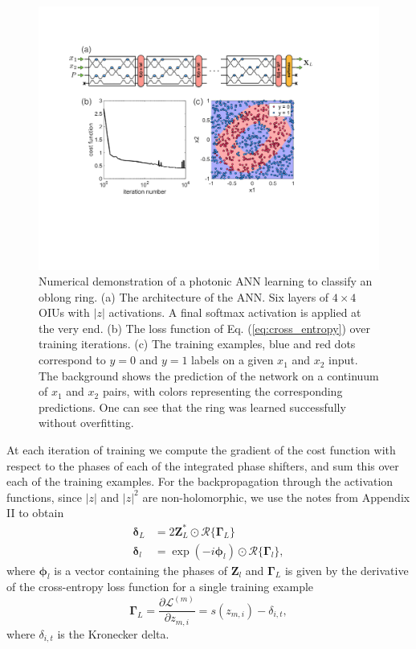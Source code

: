\begin{figure}
\includegraphics[width=\columnwidth]{figures/insitu_ring}
\caption{Numerical demonstration of a photonic ANN learning to classify an oblong ring. (a) The architecture of the ANN.  Six layers of $4 \times 4$ OIUs with $|z|$ activations.  A final softmax activation is applied at the very end.  (b) The loss function of Eq. (\ref{eq:cross_entropy}) over training iterations. (c) The training examples, blue and red dots correspond to $y=0$ and $y=1$ labels on a given $x_1$ and $x_2$ input.  The background shows the prediction of the network on a continuum of $x_1$ and $x_2$ pairs, with colors representing the corresponding predictions.  One can see that the ring was learned successfully without overfitting.  \label{fig:demo} }
\end{figure}

At each iteration of training we compute the gradient of the cost function with respect to the phases of each of the integrated phase shifters, and sum this over each of the training examples. For the backpropagation through the activation functions, since $|z|$ and $|z|^2$ are non-holomorphic, we use the notes from Appendix II to obtain
%
\begin{align}
\bm{\delta}_L &= 2 \mathbf{Z}_L^* \odot \mathcal{R}\{\bm{\Gamma}_L\} \\
\bm{\delta}_l &= \exp(-i\bm{\phi}_l) \odot \mathcal{R}\{\bm{\Gamma}_l\},
\end{align}
where $\bm{\phi}_l$ is a vector containing the phases of $\mathbf{Z}_l$ and $\bm{\Gamma}_L$ is given by the derivative of the cross-entropy loss function for a single training example 
%
\begin{equation}
\bm{\Gamma}_L = \frac{\partial \mathcal{L}^{(m)}}{\partial z_{m, i}} = s(z_{m, i}) - \delta_{i, t},  
\end{equation}
%
where $\delta_{i, t}$ is the Kronecker delta. 

